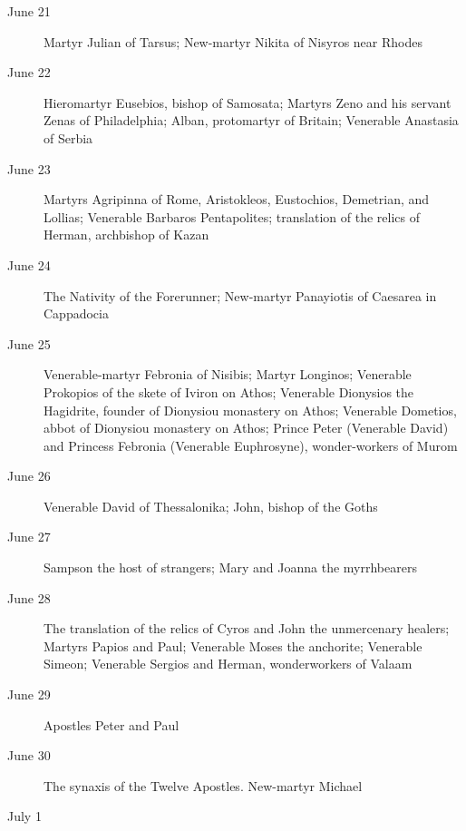 \begin{description}
\item[June 21]

Martyr Julian of Tarsus; New-martyr Nikita of Nisyros near Rhodes

\item[June 22]

Hieromartyr Eusebios, bishop of Samosata; Martyrs Zeno and his servant Zenas of Philadelphia; Alban, protomartyr of Britain; Venerable Anastasia of Serbia

\item[June 23]

Martyrs Agripinna of Rome, Aristokleos, Eustochios, Demetrian, and Lollias; Venerable Barbaros Pentapolites; translation of the relics of Herman, archbishop of Kazan

\item[June 24]

The Nativity of the Forerunner; New-martyr Panayiotis of Caesarea in Cappadocia

\item[June 25]

Venerable-martyr Febronia of Nisibis; Martyr Longinos; Venerable Prokopios of the skete of Iviron on Athos; Venerable Dionysios the Hagidrite, founder of Dionysiou monastery on Athos; Venerable Dometios, abbot of Dionysiou monastery on Athos; Prince Peter (Venerable David) and Princess Febronia (Venerable Euphrosyne), wonder-workers of Murom

\item[June 26]

Venerable David of Thessalonika; John, bishop of the Goths

\item[June 27]

Sampson the host of strangers; Mary and Joanna the myrrhbearers

\item[June 28]

The translation of the relics of Cyros and John the unmercenary healers; Martyrs Papios and Paul; Venerable Moses the anchorite; Venerable Simeon; Venerable Sergios and Herman, wonderworkers of Valaam

\item[June 29]

Apostles Peter and Paul

\item[June 30]

The synaxis of the Twelve Apostles. New-martyr Michael
\item[July 1]


\end{description}

